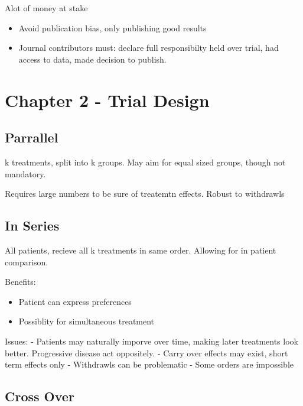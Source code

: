 \documentclass[
  letterpaper,
  DIV=11,
  numbers=noendperiod]{scrreprt}
\providecommand{\tightlist}{%
  \setlength{\itemsep}{0pt}\setlength{\parskip}{0pt}}\usepackage{longtable,booktabs,array}
\begin{document}
Alot of money at stake

\begin{itemize}
\tightlist
\item
  Avoid publication bias, only publishing good results
\item
  Journal contributors must: declare full responsibilty held over trial,
  had access to data, made decision to publish.
\end{itemize}

\hypertarget{chapter-2---trial-design}{%
\section{Chapter 2 - Trial Design}\label{chapter-2---trial-design}}

\hypertarget{parrallel}{%
\subsection{Parrallel}\label{parrallel}}

k treatments, split into k groups. May aim for equal sized groups,
though not mandatory.

Requires large numbers to be sure of treatemtn effects. Robust to
withdrawls

\hypertarget{in-series}{%
\subsection{In Series}\label{in-series}}

All patients, recieve all k treatments in same order. Allowing for in
patient comparison.

Benefits:

\begin{itemize}
\tightlist
\item
  Patient can express preferences
\item
  Possiblity for simultaneous treatment
\end{itemize}

Issues: - Patients may naturally imporve over time, making later
treatments look better. Progressive disease act oppositely. - Carry over
effects may exist, short term effects only - Withdrawls can be
problematic - Some orders are impossible

\hypertarget{cross-over}{%
\subsection{Cross Over}\label{cross-over}}
\end{document}
